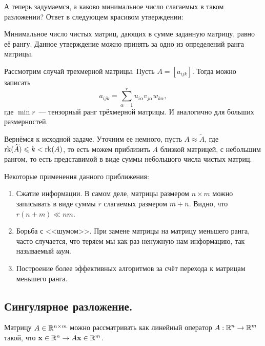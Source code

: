 А теперь задумаемся, а каково минимальное число слагаемых в таком разложении? Ответ в следующем красивом утверждении:
\begin{claim}
    Минимальное число чистых матриц, дающих в сумме заданную матрицу, равно её рангу.
    Данное утверждение можно принять за одно из определений ранга матрицы.
\end{claim}

\begin{exercise}
    Рассмотрим случай трехмерной матрицы. Пусть $A = [a_{ijk}]$. Тогда можно записать
    \[
        a_{ijk}=\sum_{\alpha=1}^r u_{i\alpha}v_{j\alpha}w_{k\alpha},
    \]
    где $\min r$~--- тензорный ранг трёхмерной матрицы. И аналогично для больших размерностей.
\end{exercise}

Вернёмся к исходной задаче. Уточним ее немного, пусть $A\approx \widetilde{A}$, где
$\operatorname{rk}(\widetilde{A})\leqslant k<\operatorname{rk}(A)$, то есть можем приблизить $A$ близкой матрицей, с небольшим рангом, то есть
представимой в виде суммы небольшого числа чистых матриц.

Некоторые применения данного приближения:
\begin{enumerate}[label=\protect\circled{\arabic*}]
    \item Сжатие информации. В самом деле, матрицы размером $n\times m$ можно записывать в виде суммы
          $r$ слагаемых размером $m+n$. Видно, что $r(n+m)\ll nm$.
    \item Борьба с <<шумом>>. При замене матрицы на матрицу меньшего ранга, часто случается, что теряем мы как раз
          ненужную нам информацию, так называемый \textit{шум}.
    \item Построение более эффективных алгоритмов за счёт перехода к матрицам меньшего ранга.
\end{enumerate}

\subsection{Сингулярное разложение.}
Матрицу $A\in\mathbb{R}^{n\times m}$ можно рассматривать как линейный оператор $A: \mathbb{R}^n\rightarrow \mathbb{R}^m$ такой, что
$\mathbf{x}\in\mathbb{R}^n\rightarrow A\mathbf{x}\in\mathbb{R}^m$.

